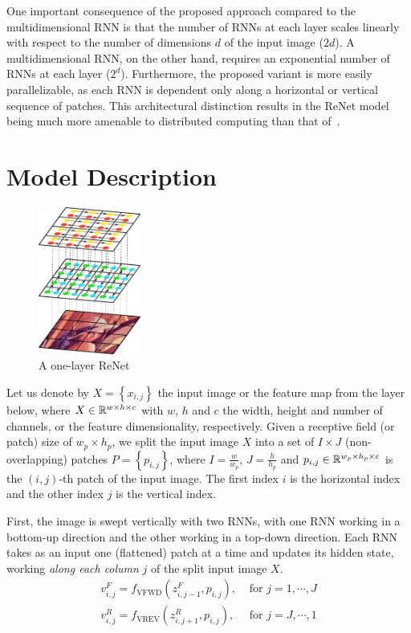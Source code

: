 One important consequence of the proposed approach compared to the
multidimensional RNN is that the number of RNNs at each layer scales linearly
with respect to the number of dimensions $d$ of the input image ($2d$). A
multidimensional RNN, on the other hand, requires an exponential number of RNNs
at each layer ($2^d$). Furthermore, the proposed variant is more easily
parallelizable, as each RNN is dependent only along a horizontal or vertical
sequence of patches. This architectural distinction results in the ReNet model
being much more amenable to distributed computing than that
of~\citet{Graves+Schmidhuber-2009}.

\vfill

\section{Model Description}

\begin{figure}
    \centering
    \includegraphics[width=0.3\textwidth]{pdf/renet_first_layer.pdf}
    \caption{A one-layer ReNet}
    \label{fig:networklayer}
    \vspace{-3mm}
\end{figure}

Let us denote by $X=\left\{x_{i,j}\right\}$ the input image or the feature map
from the layer below, where $X \in \mathbb{R}^{w \times h \times c}$ with $w$, $h$ and
$c$ the width, height and number of channels, or the feature dimensionality,
respectively. Given a receptive field (or patch) size of $w_p \times h_p$, we
split the input image $X$ into a set of $I \times J$ (non-overlapping) patches
$P = \left\{ p_{i,j} \right\}$, where $I = \frac{w}{w_p}$, $J = \frac{h}{h_p}$
and $p_{i,j} \in \mathbb{R}^{w_p \times h_p \times c}$ is the $(i,j)$-th patch of the
input image. The first index $i$ is the horizontal index and the other index
$j$ is the vertical index.

First, the image is swept vertically with two RNNs, with one RNN working in
a bottom-up direction and the other working in a top-down direction.
Each RNN takes as an input one (flattened) patch at a time and updates its
hidden state, working \emph{along each column} $j$ of the split input image $X$.
\begin{align}
    v^F_{i,j} = f_{\text{VFWD}}(z^F_{i,j-1},p_{i,j}), &\text{ for
    }j=1,\cdots, J\\
    v^R_{i,j} = f_{\text{VREV}}(z^R_{i,j+1},p_{i,j}), &\text{ for
    }j=J,\cdots,1
\end{align}

